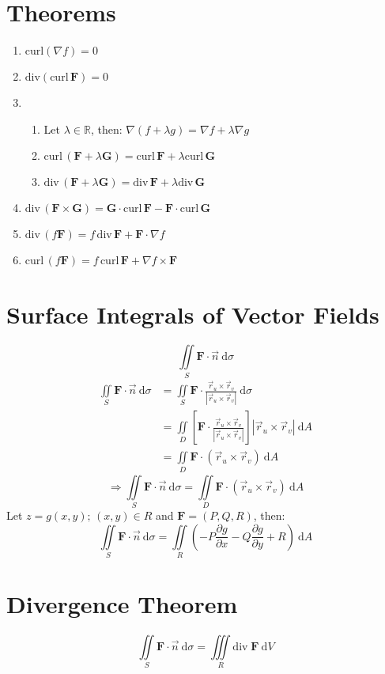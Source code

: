 \documentclass[12pt, fleqn]{book}
\newcommand{\D}{\mathrm{d}}
\newcommand{\iis}{\iint\limits_S}
\newcommand{\rutrv}{\vec{r}_u \times \vec{r}_v\right}
\newcommand{\F}{\mathbf{F}}
\newcommand{\G}{\mathbf{G}}
\newcommand{\Curl}{\mathrm{curl}}
\newcommand{\Div}{\mathrm{div}}
\newcommand{\xy}{(x, y)}
\newcommand{\rond}[2]{\frac{\partial #1}{\partial #2}}
\begin{document}
     	\section{Theorems}
     		\begin{enumerate}
     			\item $\Curl(\nabla f) = 0$
     			\item $\Div(\Curl \, \F) = 0$
                \item \begin{enumerate}
     					\item Let $\lambda \in \mathbb{R}$, then: $\nabla(f + \lambda g) = \nabla f + \lambda \nabla g$
		     			\item $\Curl \, (\F + \lambda \G) = \Curl \, \F + \lambda\Curl \, \G$
		     			\item $\Div \, (\F + \lambda \G) = \Div \, \F + \lambda\Div \, \G$
     			\end{enumerate}
     			\item $\Div \, (\F \times \G) = \G \cdot \Curl \, \F - \F \cdot \Curl \, \G$
     			\item $\Div \, (f \F) = f \, \Div \, \F + \F \cdot \nabla f$
     			\item $\Curl \, (f \F) = f \, \Curl \, \F + \nabla f \times \F$
     		\end{enumerate}
     	\section{Surface Integrals of Vector Fields}
     		\begin{equation}
     			\iis \F \cdot \vec{n} \ \D \sigma
     		\end{equation}
     		\begin{equation*}
     			\begin{split}
     				\iis \F \cdot \vec{n} \ \D \sigma
     				&  = \iis \F \cdot \frac{\vec{r}_u \times \vec{r}_v}{\left|\rutrv|} \ \D \sigma \\
     				& = \iint\limits_D \left[\F \cdot \frac{\vec{r}_u \times \vec{r}_v}{\left|\rutrv|}\right] \left|\rutrv| \ \D A \\
     				& = \iint\limits_D \F \cdot \left(\rutrv) \ \D A
     			\end{split}
     		\end{equation*}
     	    \begin{equation}
     	    	\Rightarrow 
     	    	\iis \F \cdot \vec{n} \ \D \sigma = \iint\limits_D \F \cdot \left(\rutrv) \ \D A
     	    \end{equation}
     		Let $z = g\xy; \, \xy \in R$ and $\F = (P, Q, R)$, then:
     		\begin{equation}
     			\iis \F \cdot \vec{n} \ \D \sigma = 
     			\iint\limits_R \left(-P \rond{g}{x} - Q\rond{g}{y} + R\right) \ \D A
     		\end{equation}
     	
     	\section{Divergence Theorem}
     		\begin{equation}
     			\iis \F \cdot \vec{n} \ \D \sigma = \iiint\limits_R \Div \; \F \ \D V
     		\end{equation}
\end{document}
